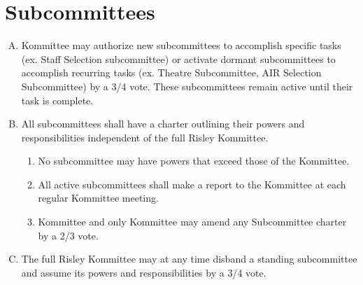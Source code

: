 \documentclass[12pt]{article}
\begin{document}
\section{Subcommittees}
\begin{enumerate}[A.]
\item Kommittee may authorize new subcommittees to accomplish specific tasks (ex. Staff Selection subcommittee) or activate dormant subcommittees to accomplish recurring tasks (ex. Theatre Subcommittee, AIR Selection Subcommittee) by a 3/4 vote. These subcommittees remain active until their task is complete.
\item All subcommittees shall have a charter outlining their powers and responsibilities independent of the full Risley Kommittee.
\begin{enumerate}[1.]
\item No subcommittee may have powers that exceed those of the Kommittee.
\item All active subcommittees shall make a report to the Kommittee at each regular Kommittee meeting.
\item Kommittee and only Kommittee may amend any Subcommittee charter by a 2/3 vote.
\end{enumerate}
\item The full Risley Kommittee may at any time disband a standing subcommittee and assume its powers and responsibilities by a 3/4 vote.
\end{enumerate}
\end{document}
